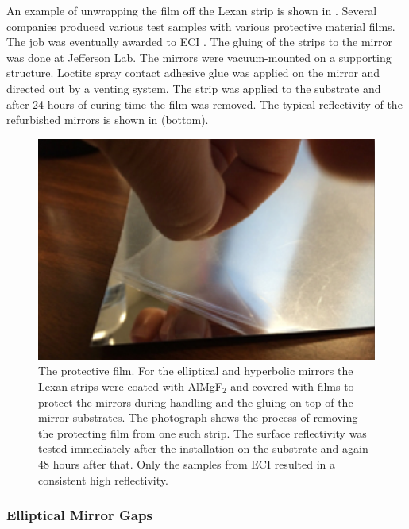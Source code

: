 An example of unwrapping the film off the Lexan strip is shown in . Several companies produced various test samples with various protective material films. The job was eventually awarded to ECI \cite{ECI}.
The gluing of the strips to the mirror was done at Jefferson Lab. The mirrors were vacuum-mounted on a
supporting structure.
Loctite spray contact adhesive glue was applied on the mirror and directed out by a venting system.
The strip was applied to the substrate and after 24 hours of curing time the film was removed.
The typical reflectivity of the refurbished mirrors is shown in  (bottom).

\begin{figure}
\centering
	\includegraphics[width=0.98\columnwidth, height=0.7\columnwidth]{img/filmOnStrip.png}
	\caption{The protective film. For the elliptical and hyperbolic mirrors the Lexan strips were coated with AlMgF$_2$
			 and covered with films to protect the mirrors during handling and the gluing on top of the mirror substrates.
             The photograph shows the process of removing the protecting film from one such strip.
             The surface reflectivity was tested immediately after the installation on the substrate and again 48 hours after that.
             Only the samples from ECI \cite{ECI} resulted in a consistent high reflectivity. }
	\label{fig:filmOnStrip}
\end{figure}

\subsubsection{Elliptical Mirror Gaps}

